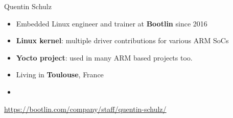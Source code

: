 \begin{frame}{Quentin Schulz}
    \begin{itemize}
	\item Embedded Linux engineer and trainer at {\bf Bootlin}
              since 2016
	\item {\bf Linux kernel}: multiple driver contributions for
              various ARM SoCs
	\item {\bf Yocto project}: used in many ARM based projects too.
	\item Living in {\bf Toulouse}, France
	\item {}
    \end{itemize}
    {\small \url{https://bootlin.com/company/staff/quentin-schulz/}}
\end{frame}
